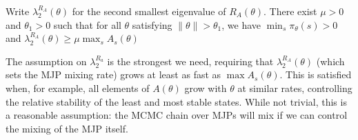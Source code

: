 \begin{assumption}
  Write $\lambda^{R_A}_2(\theta)$ for the second smallest eigenvalue of
    $R_A(\theta)$. There exist $\mu > 0$ and $\theta_1 > 0$
    such that for all $\theta$ satisfying $ \| \theta \|> \theta_1$, 
    we have $\min_s \pi_\theta(s) > 0$ and 
    $ \lambda^{R_A}_2(\theta) \geq \mu \max_s A_s(\theta)$
  \label{asmp:cond_num}
\end{assumption} 
\noindent %
The assumption on $\lambda^{R_a}_2$ is the strongest we need, requiring that 
$\lambda^{R_A}_2(\theta)$ (which sets the MJP mixing rate) grows 
at least as fast as $\max A_s(\theta)$. 
This is satisfied when, for example, all elements of $A(\theta)$ grow 
with $\theta$ at similar rates, controlling the relative stability of 
the least and most stable states.
While not trivial, this is a reasonable assumption: the MCMC chain over MJPs 
will mix if we can control the mixing of the MJP itself.
